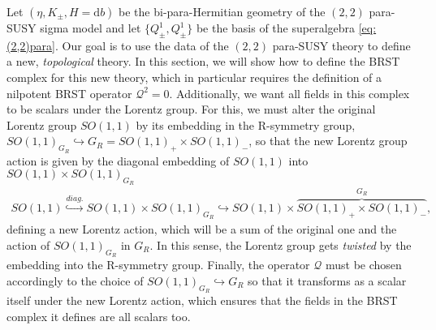 \documentclass{article}
\newcommand{\QQ}{\mathcal{Q}}
\newcommand{\rd}{\mathrm{d}}
\theoremstyle{definition}
\theoremstyle{remark}
\begin{document}
Let $(\eta,K_\pm,H=\rd b)$ be the bi-para-Hermitian geometry of the $(2,2)$ para-SUSY sigma model and let $\{Q^1_\pm,Q^1_\pm\}$ be the basis of the superalgebra \eqref{eq:(2,2)para}. Our goal is to use the data of the $(2,2)$ para-SUSY theory to define a new, {\it topological} theory. In this section, we will show how to define the BRST complex for this new theory, which in particular requires the definition of a nilpotent BRST operator $\QQ^2=0$. Additionally, we want all fields in this complex to be scalars under the Lorentz group. For this, we must alter the original Lorentz group $SO(1,1)$ by its embedding in the R-symmetry group, $SO(1,1)_{G_R}\hookrightarrow G_R=SO(1,1)_+\times SO(1,1)_-$, so that the new Lorentz group action is given by the diagonal embedding of $SO(1,1)$ into $SO(1,1)\times SO(1,1)_{G_R}$
\begin{align}\label{embeddings}
SO(1,1)\overset{diag.}{\hookrightarrow} SO(1,1)\!\times\! SO(1,1)_{G_R}\!\!\hookrightarrow SO(1,1)\!\times\! \overbrace{SO(1,1)_+\!\times\! SO(1,1)_-}^{G_R},
\end{align}
defining a new Lorentz action, which will be a sum of the original one and the action of $SO(1,1)_{G_R}$ in $G_R$. In this sense, the Lorentz group gets {\it twisted} by the embedding into the R-symmetry group. Finally, the operator $\QQ$ must be chosen accordingly to the choice of $SO(1,1)_{G_R}\hookrightarrow G_R$ so that it transforms as a scalar itself under the new Lorentz action, which ensures that the fields in the BRST complex it defines are all scalars too.
\end{document}
